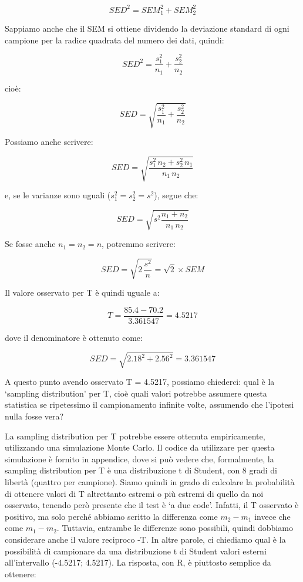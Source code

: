 \documentclass[a4paper,12pt,oneside]{book}
\begin{document}
\[SED^2 = SEM_1^2 + SEM_2^2\]

Sappiamo anche che il SEM si ottiene dividendo la deviazione standard di ogni campione per la radice quadrata del numero dei dati, quindi:

\[SED^2 = \frac{s_1^2}{n_1} +  \frac{s_2^2}{n_2}\]

cioè:

\[SED = \sqrt{ \frac{s_1^2}{n_1} +  \frac{s_2^2}{n_2} }\]

Possiamo anche scrivere:

\[SED = \sqrt{ \frac{s_1^2 \, n_2 + s_2^2 \, n_1}{n_1 \, n_2} }\]

e, se le varianze sono uguali (\(s_1^2 = s_2^2 = s^2\)), segue che:

\[SED = \sqrt {s^2 \frac{n_1  + n_2}{n_1 \, n_2 } }\]

Se fosse anche \(n_1 = n_2 =n\), potremmo scrivere:

\[SED = \sqrt{2 \, \frac{s^2}{n} } = \sqrt{2} \times SEM\]

Il valore osservato per T è quindi uguale a:

\[T = \frac{85.4 - 70.2}{3.361547} = 4.5217\]

dove il denominatore è ottenuto come:

\[SED = \sqrt{ 2.18^2 +  2.56^2 } = 3.361547\]

A questo punto avendo osservato T = 4.5217, possiamo chiederci: qual è la `sampling distribution' per T, cioè quali valori potrebbe assumere questa statistica se ripetessimo il campionamento infinite volte, assumendo che l'ipotesi nulla fosse vera?

La sampling distribution per T potrebbe essere ottenuta empiricamente, utilizzando una simulazione Monte Carlo. Il codice da utilizzare per questa simulazione è fornito in appendice, dove si può vedere che, formalmente, la sampling distribution per T è una distribuzione t di Student, con 8 gradi di libertà (quattro per campione). Siamo quindi in grado di calcolare la probabilità di ottenere valori di T altrettanto estremi o più estremi di quello da noi osservato, tenendo però presente che il test è `a due code'. Infatti, il T osservato è positivo, ma solo perché abbiamo scritto la differenza come \(m_2 - m_1\) invece che come \(m_1 - m_2\). Tuttavia, entrambe le differenze sono possibili, quindi dobbiamo considerare anche il valore reciproco -T. In altre parole, ci chiediamo qual è la possibilità di campionare da una distribuzione t di Student valori esterni all'intervallo (-4.5217; 4.5217). La risposta, con R, è piuttosto semplice da ottenere:
\end{document}
